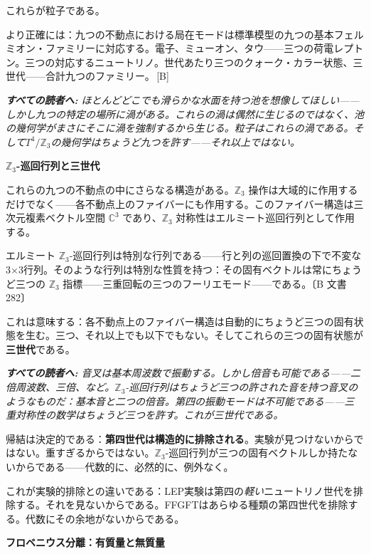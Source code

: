 \documentclass[11pt,openany]{book}
\newcommand{\status}[1]{\penalty10000\,{\tiny\textcolor{gray!70}{[#1]}}}
\newenvironment{laierspur}{%
  \par\vspace{4pt}%
  \noindent\small\itshape\color{blue!60!black}%
  \textbf{すべての読者へ:}\enspace\ignorespaces}{%
  \par\vspace{4pt}\normalsize\normalfont\normalcolor}
\begin{document}
これらが粒子である。

より正確には：九つの不動点における局在モードは標準模型の九つの基本フェルミオン・ファミリーに対応する。電子、ミューオン、タウ——三つの荷電レプトン。三つの対応するニュートリノ。世代あたり三つのクォーク・カラー状態、三世代——合計九つのファミリー。\status{B}

\begin{laierspur}
ほとんどどこでも滑らかな水面を持つ池を想像してほしい——しかし九つの特定の場所に渦がある。これらの渦は偶然に生じるのではなく、池の幾何学がまさにそこに渦を強制するから生じる。粒子はこれらの渦である。そして$T^4/\mathbb{Z}_3$の幾何学はちょうど九つを許す——それ以上ではない。
\end{laierspur}

\textbf{$\mathbb{Z}_3$-巡回行列と三世代}

これらの九つの不動点の中にさらなる構造がある。$\mathbb{Z}_3$ 操作は大域的に作用するだけでなく——各不動点上のファイバーにも作用する。このファイバー構造は三次元複素ベクトル空間 $\mathbb{C}^3$ であり、$\mathbb{Z}_3$ 対称性はエルミート巡回行列として作用する。

エルミート $\mathbb{Z}_3$-巡回行列は特別な行列である——行と列の巡回置換の下で不変な3×3行列。そのような行列は特別な性質を持つ：その固有ベクトルは常にちょうど三つの $\mathbb{Z}_3$ 指標——三重回転の三つのフーリエモード——である。〔B 文書 282〕

これは意味する：各不動点上のファイバー構造は自動的にちょうど三つの固有状態を生む。三つ、それ以上でも以下でもない。そしてこれらの三つの固有状態が\textbf{三世代}である。

\begin{laierspur}
音叉は基本周波数で振動する。しかし倍音も可能である——二倍周波数、三倍、など。$\mathbb{Z}_3$-巡回行列はちょうど三つの許された音を持つ音叉のようなものだ：基本音と二つの倍音。第四の振動モードは不可能である——三重対称性の数学はちょうど三つを許す。これが三世代である。
\end{laierspur}

帰結は決定的である：\textbf{第四世代は構造的に排除される}。実験が見つけないからではない。重すぎるからではない。$\mathbb{Z}_3$-巡回行列が三つの固有ベクトルしか持たないからである——代数的に、必然的に、例外なく。

これが実験的排除との違いである：LEP実験は第四の\textit{軽い}ニュートリノ世代を排除する。それを見ないからである。FFGFTはあらゆる種類の第四世代を排除する。代数にその余地がないからである。

\textbf{フロベニウス分離：有質量と無質量}
\end{document}
